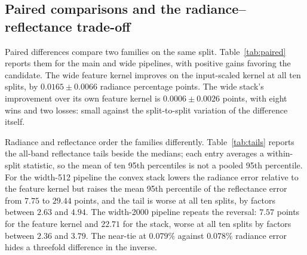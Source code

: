 \subsection{Paired comparisons and the radiance--reflectance trade-off}\label{sec:paired-tails}

Paired differences compare two families on the same split. Table~\ref{tab:paired} reports them
for the main and wide pipelines, with positive gains favoring the candidate. The wide feature
kernel improves on the input-scaled kernel at all ten splits, by $0.0165\pm0.0066$ radiance
percentage points. The wide stack's improvement over its own feature kernel is $0.0006\pm0.0026$
points, with eight wins and two losses: small against the split-to-split variation of the
difference itself.

\begin{table}[t]
\centering\small
\resizebox{\textwidth}{!}{}
\caption{Paired radiance contrasts on seeds 101--110. Gain is the reference error minus the
candidate error, in percentage points (pp). SD is the sample standard deviation of the ten
paired differences; the range and the win count describe the same ten differences.}
\label{tab:paired}
\end{table}

Radiance and reflectance order the families differently. Table~\ref{tab:tails} reports the
all-band reflectance tails beside the medians; each entry averages a within-split statistic, so
the mean of ten 95th percentiles is not a pooled 95th percentile. For the width-512 pipeline the
convex stack lowers the radiance error relative to the feature kernel but raises the mean 95th
percentile of the reflectance error from $7.75$ to $29.44$ points, and the tail is worse at all
ten splits, by factors between $2.63$ and $4.94$. The width-2000 pipeline repeats the reversal:
$7.57$ points for the feature kernel and $22.71$ for the stack, worse at all ten splits by
factors between $2.36$ and $3.79$. The near-tie at $0.079\%$ against $0.078\%$ radiance error
hides a threefold difference in the inverse.

\begin{table}[t]
\centering\small
\resizebox{\textwidth}{!}{}
\caption{All-band retrieval metrics over the ten splits of the main, concatenated-feature and
wide pipelines. Radiance is the mean relative $L^2$ error; the reflectance median, 95th
percentile and RMSE are in percentage points at $\rho=0.7$. The first three columns show mean
$\pm$ sample standard deviation across splits and RMSE its mean. The inverse is neither
clipped nor restricted to the physical domain; every inverse in these runs is finite, and the
RMSE is dominated by large finite values near zeros of the denominator.
Section~\ref{sec:domain} gives the same comparison on the physical domain.}
\label{tab:tails}
\end{table}

